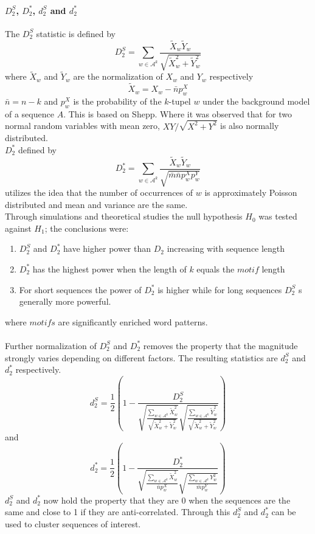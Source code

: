 \documentclass[twocolumn]{bmcart}%
\begin{document}
\paragraph*{$D_2^S$, $D_2^*$, $d_2^S$ and $d_2^*$}
The $D_2^S$ statistic is defined by
$$D_2^S=\sum_{w\in \mathcal{A}^k}\frac{\widetilde{X}_w\widetilde{Y}_w}{\sqrt{\widetilde{X}_w^2+\widetilde{Y}_w^2}}$$
where $\widetilde{X}_w$ and $\widetilde{Y}_w$ are the normalization of $X_w$ and $Y_w$ respectively
$$\widetilde{X}_w=X_w-\bar{n}p_w^X$$
$\bar{n}=n-k$ and $p_w^X$ is the probability of the  $k$-tupel $w$ under the background model of a sequence $A$.
This is based on Shepp\cite{shepp1962normal}. Where it was observed that for two normal random variables with mean zero, $XY/\sqrt{X^2+Y^2}$ is also normally distributed.\\
$D_2^*$ defined by
$$D_2^*=\sum_{w\in \mathcal{A}^k}\frac{\widetilde{X}_w\widetilde{Y}_w}{\sqrt{\bar{m}\bar{n}p_w^Xp_w^Y}}$$
utilizes the idea that the number of occurrences of $w$ is approximately Poisson distributed and mean and variance are the same.\\
Through simulations and theoretical studies the null hypothesis $H_0$ was tested against $H_1$; the conclusions were:
\begin{enumerate}
\item 	$D_2^S$ and $D_2^*$ have higher power than $D_2$ increasing with sequence length
\item $D_2^*$ has the highest power when the length of $k$ equals the $motif$ length
\item For short sequences the power of $D_2^*$ is higher while for long sequences $D_2^S$ s generally more powerful.
\end{enumerate}
where $motifs$ are significantly enriched word patterns\cite{doi:10.1093/bib/bbt067}.\\
\\
Further normalization of $D_2^S$ and $D_2^*$ removes the property that the magnitude strongly varies depending on different factors. The resulting statistics are $d_2^S$ and $d_2^*$ respectively.
$$d_2^S=\frac{1}{2}\left(1-\frac{D_2^S}{\sqrt{\frac{\sum_{w\in \mathcal{A}^k}\widetilde{X}_w^2}{\sqrt{\widetilde{X}_w^2+\widetilde{Y}_w^2}}}\sqrt{\frac{\sum_{w\in \mathcal{A}^k}\widetilde{Y}_w^2}{\sqrt{\widetilde{X}_w^2+\widetilde{Y}_w^2}}}}\right)$$
and
$$d_2^*=\frac{1}{2}\left(1-\frac{D_2^*}{\sqrt{\frac{\sum_{w\in \mathcal{A}^k}\widetilde{X}_w^2}{\bar{n}p_w^X}}\sqrt{\frac{\sum_{w\in \mathcal{A}^k}Y_w^2}{\bar{m}p_w^Y}}}\right)$$
$d_2^S$ and $d_2^*$ now hold the property that they are 0 when the sequences are the same and close to 1 if they are anti-correlated.
Through this $d_2^S$ and $d_2^*$ can be used to cluster sequences of interest. 
\end{document}
